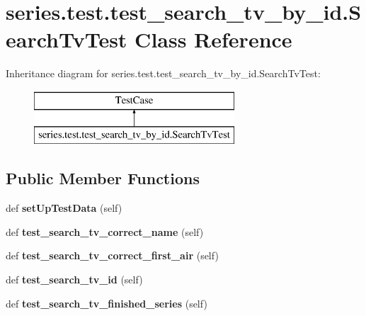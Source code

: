\hypertarget{classseries_1_1test_1_1test__search__tv__by__id_1_1_search_tv_test}{}\section{series.\+test.\+test\+\_\+search\+\_\+tv\+\_\+by\+\_\+id.\+Search\+Tv\+Test Class Reference}
\label{classseries_1_1test_1_1test__search__tv__by__id_1_1_search_tv_test}
Inheritance diagram for series.\+test.\+test\+\_\+search\+\_\+tv\+\_\+by\+\_\+id.\+Search\+Tv\+Test\+:\begin{figure}[H]
\begin{center}
\leavevmode
\includegraphics[height=2.000000cm]{classseries_1_1test_1_1test__search__tv__by__id_1_1_search_tv_test}
\end{center}
\end{figure}
\subsection*{Public Member Functions}
\begin{DoxyCompactItemize}
\item 
\mbox{\label{classseries_1_1test_1_1test__search__tv__by__id_1_1_search_tv_test_aac5b5b6785073678341965f6613d6a69}} 
def {\bfseries set\+Up\+Test\+Data} (self)
\item 
\mbox{\label{classseries_1_1test_1_1test__search__tv__by__id_1_1_search_tv_test_a6fc5fb2e2fc918157909042b711fbf7d}} 
def {\bfseries test\+\_\+search\+\_\+tv\+\_\+correct\+\_\+name} (self)
\item 
\mbox{\label{classseries_1_1test_1_1test__search__tv__by__id_1_1_search_tv_test_a1453f112b0fe2fc20eafe6abb7d56081}} 
def {\bfseries test\+\_\+search\+\_\+tv\+\_\+correct\+\_\+first\+\_\+air} (self)
\item 
\mbox{\label{classseries_1_1test_1_1test__search__tv__by__id_1_1_search_tv_test_a07d1f05c7c5e7c079b737746013f6005}} 
def {\bfseries test\+\_\+search\+\_\+tv\+\_\+id} (self)
\item 
\mbox{\label{classseries_1_1test_1_1test__search__tv__by__id_1_1_search_tv_test_a88f29a38a00988e90d027661553379da}} 
def {\bfseries test\+\_\+search\+\_\+tv\+\_\+finished\+\_\+series} (self)
\end{DoxyCompactItemize}
